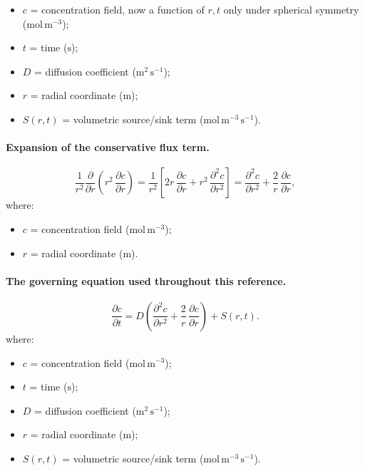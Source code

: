 \documentclass[11pt,a4paper]{article}
\newcommand{\conc}{c}
\newcommand{\pd}[2]{\frac{\partial #1}{\partial #2}}
\newcommand{\pdd}[2]{\frac{\partial^{2} #1}{\partial #2^{2}}}
\newcommand{\Diff}{D}
\begin{document}
\begin{itemize}[leftmargin=1.6em,itemsep=1pt,topsep=3pt,parsep=0pt]
  \item $c$ = concentration field, now a function of $r,t$ only under spherical symmetry ($\mathrm{mol\,m^{-3}}$);
  \item $t$ = time ($\mathrm{s}$);
  \item $D$ = diffusion coefficient ($\mathrm{m^{2}\,s^{-1}}$);
  \item $r$ = radial coordinate ($\mathrm{m}$);
  \item $S(r,t)$ = volumetric source/sink term ($\mathrm{mol\,m^{-3}\,s^{-1}}$).
\end{itemize}



\paragraph{Expansion of the conservative flux term.}

\begin{equation}
  \frac{1}{r^{2}} \pd{}{r}\!\left( r^{2}\,\pd{\conc}{r} \right)
  = \frac{1}{r^{2}} \left[ 2r\,\pd{\conc}{r} + r^{2}\,\pdd{\conc}{r} \right]
  = \pdd{\conc}{r} + \frac{2}{r}\,\pd{\conc}{r},
  \label{eq:product-rule}
\end{equation}
\vspace{-0.3em}
\noindent where:

\begin{itemize}[leftmargin=1.6em,itemsep=1pt,topsep=3pt,parsep=0pt]
  \item $c$ = concentration field ($\mathrm{mol\,m^{-3}}$);
  \item $r$ = radial coordinate ($\mathrm{m}$).
\end{itemize}



\paragraph{The governing equation used throughout this reference.}

\begin{equation}
  \boxed{\;
  \pd{\conc}{t}
  = \Diff \left( \pdd{\conc}{r} + \frac{2}{r}\,\pd{\conc}{r} \right) + S(r,t).
  \;}
  \label{eq:simplified-triso}
\end{equation}
\vspace{-0.3em}
\noindent where:

\begin{itemize}[leftmargin=1.6em,itemsep=1pt,topsep=3pt,parsep=0pt]
  \item $c$ = concentration field ($\mathrm{mol\,m^{-3}}$);
  \item $t$ = time ($\mathrm{s}$);
  \item $D$ = diffusion coefficient ($\mathrm{m^{2}\,s^{-1}}$);
  \item $r$ = radial coordinate ($\mathrm{m}$);
  \item $S(r,t)$ = volumetric source/sink term ($\mathrm{mol\,m^{-3}\,s^{-1}}$).
\end{itemize}
\end{document}
